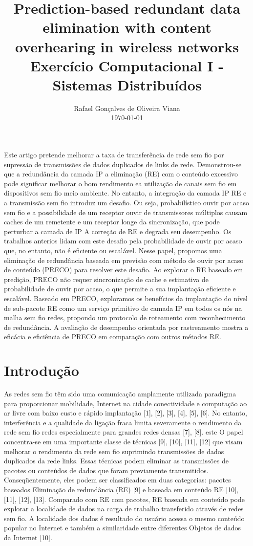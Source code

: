 \documentclass[12pt]{article}
\title{Prediction-based redundant data elimination with content overhearing in wireless networks  \\ Exercício Computacional I - Sistemas Distribuídos}
\author{Rafael Gonçalves de Oliveira Viana\inst{1} \\\vspace*{10pt} \normalsize  \today{} }
\begin{document}
 

\maketitle

     
\begin{resumo} 	
	Este artigo pretende melhorar a taxa de transferência  de rede sem fio
    por supressão de transmissões de dados duplicados de
	links de rede. Demonstrou-se que a redundância da camada IP
	a eliminação (RE) com o conteúdo excessivo pode significar
	melhorar o bom rendimento ea utilização de canais sem fio em dispositivos sem fio
	meio ambiente. No entanto, a integração da camada IP RE e
	a transmissão sem fio introduz um desafio. Ou seja, probabilístico
	ouvir por acaso sem fio e a possibilidade de um receptor ouvir
	de transmissores múltiplos causam caches de um remetente e um
	receptor longe da sincronização, que pode perturbar a camada de IP
	A correção de RE e degrada seu desempenho.
	Os trabalhos anterios lidam com este desafio pela probabilidade de ouvir por acaso
	que, no entanto, não é eficiente ou escalável.
	Nesse papel, propomos uma eliminação de redundância baseada em previsão com
	método de ouvir por acaso de conteúdo (PRECO) para resolver este desafio.
	Ao explorar o RE baseado em predição, PRECO não requer
	sincronização de cache e estimativa de probabilidade de ouvir por acaso,
	o que permite a sua implantação eficiente e escalável. Baseado em
	PRECO, exploramos os benefícios da implantação do nível de sub-pacote
	RE como um serviço primitivo de camada IP em todos os nós na malha sem fio
	redes, propondo um protocolo de roteamento com reconhecimento de redundância.
	A avaliação de desempenho orientada por rastreamento mostra a eficácia e
	eficiência de PRECO em comparação com outros métodos RE.
\end{resumo}
\section{Introdução}

As redes sem fio têm sido uma comunicação amplamente utilizada
paradigma para proporcionar mobilidade, Internet na cidade
conectividade e computação ao ar livre com baixo custo e rápido
implantação [1], [2], [3], [4], [5], [6]. No entanto, interferência
e a qualidade da ligação fraca limita severamente o rendimento da rede sem fio
redes especialmente para grandes redes densas [7], [8]. este
O papel concentra-se em uma importante classe de técnicas [9], [10],
[11], [12] que visam melhorar o rendimento da rede sem fio
suprimindo transmissões de dados duplicados da rede
links. Essas técnicas podem eliminar as transmissões de
pacotes ou conteúdos de dados que foram previamente transmitidos.
Conseqüentemente, eles podem ser classificados em duas categorias: pacotes baseados
Eliminação de redundância (RE) [9] e baseada em conteúdo
RE [10], [11], [12], [13]. Comparado com RE com pacotes,
RE baseada em conteúdo pode explorar a localidade de dados na carga de trabalho
transferido através de redes sem fio. A localidade dos dados é resultado
do usuário acessa o mesmo conteúdo popular no
Internet e também a similaridade entre diferentes
Objetos de dados da Internet [10].
\end{document}

